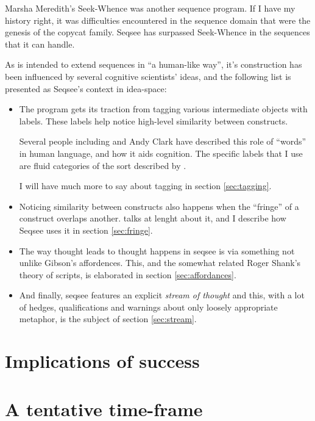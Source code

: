 \documentclass[letterpaper]{article}
\begin{document}
Marsha Meredith's Seek-Whence \cite{Meredith} was another sequence program. If I have my history right, it was difficulties encountered in the sequence domain that were the genesis of the copycat family. Seqsee has surpassed Seek-Whence in the sequences that it can handle.

As \seq is intended to extend sequences in ``a human-like way'', it's construction has been influenced by several cognitive scientists' ideas, and the following list is presented as Seqsee's context in idea-space:

\begin{itemize}
\item The program gets its traction from tagging various intermediate objects with labels. These labels help \seq notice high-level similarity between constructs.

Several people including  and Andy Clark \cite{Clark:MindWare,Clark:MagicWords} have described this role of ``words'' in human language, and how it aids cognition. The specific labels that I use are fluid categories of the sort described by \hof.

I will have much more to say about tagging in section \ref{sec:tagging}.

\item Noticing similarity between constructs also happens when the ``fringe'' of a construct overlaps another.  talks at lenght about it, and I describe how Seqsee uses it in section \ref{sec:fringe}. 

\item The way thought leads to thought happens in seqsee is via something not unlike Gibson's affordences.  This, and the somewhat related Roger Shank's theory of scripts, is elaborated in section \ref{sec:affordances}.

\item And finally, seqsee features an explicit \emph{stream of thought} \cite{James} and this, with a lot of hedges, qualifications and warnings about only loosely appropriate metaphor, is the subject of section \ref{sec:stream}.
\end{itemize}





\section{Implications of success}
\section{A tentative time-frame}


\printindex
\end{document}
